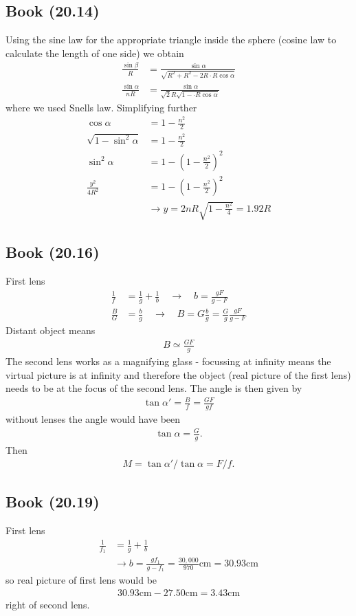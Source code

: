 \documentclass[../main.tex]{subfiles}
\begin{document}
\subsection{Book (20.14)}
Using the sine law for the appropriate triangle inside the sphere (cosine law to calculate the length of one side) we obtain
\begin{align}
\frac{\sin\beta}{R}&=\frac{\sin\alpha}{\sqrt{R^2+R^2-2R\cdot R\cos\alpha}}\\
\frac{\sin\alpha}{nR}&=\frac{\sin\alpha}{\sqrt{2}R\sqrt{1-\cdot R\cos\alpha}}
\end{align}
where we used Snells law. Simplifying further
\begin{align}
\cos\alpha&=1-\frac{n^2}{2}\\
\sqrt{1-\sin^2\alpha}&=1-\frac{n^2}{2}\\
\sin^2\alpha&=1-\left(1-\frac{n^2}{2}\right)^2\\
\frac{y^2}{4R^2}&=1-\left(1-\frac{n^2}{2}\right)^2\\
&\rightarrow y=2nR\sqrt{1-\frac{n^2}{4}}=1.92R
\end{align}

\subsection{Book (20.16)}
First lens
\begin{align}
\frac{1}{f}&=\frac{1}{g}+\frac{1}{b}\quad\rightarrow\quad b=\frac{gF}{g-F}\\
\frac{B}{G}&=\frac{b}{g}\quad\rightarrow\quad B=G\frac{b}{g}=\frac{G}{g}\frac{gF}{g-F}
\end{align}
Distant object means
\begin{align}
B\simeq\frac{GF}{g}
\end{align}
The second lens works as a magnifying glass - focussing at infinity means the virtual picture is at infinity and therefore the object (real picture of the first lens) needs to be at the focus of the second lens.
The angle is then given by
\begin{align}
\tan\alpha'=\frac{B}{f}=\frac{GF}{gf}
\end{align}
without lenses the angle would have been
\begin{align}
\tan\alpha=\frac{G}{g}.
\end{align}
Then
\begin{align}
M=\tan\alpha'/\tan\alpha=F/f.
\end{align}

\subsection{Book (20.19)}
First lens
\begin{align}
\frac{1}{f_1}&=\frac{1}{g}+\frac{1}{b}\\
&\rightarrow b=\frac{gf_1}{g-f_1}=\frac{30,000}{970}\text{cm}=30.93\text{cm}
\end{align}
so real picture of first lens would be
\begin{align}
30.93\text{cm}-27.50\text{cm}=3.43\text{cm}
\end{align}
right of second lens. 
\end{document}
